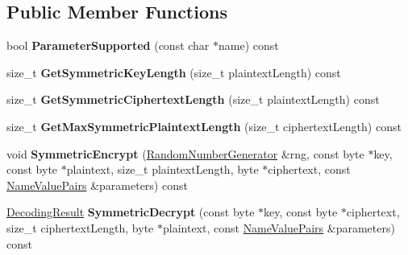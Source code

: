\subsection*{Public Member Functions}
\begin{DoxyCompactItemize}
\item 
\hypertarget{class_d_l___encryption_algorithm___xor_acc408852b435f42e49e8df2ea8d11bc2}{
bool {\bfseries ParameterSupported} (const char $\ast$name) const }
\label{class_d_l___encryption_algorithm___xor_acc408852b435f42e49e8df2ea8d11bc2}

\item 
\hypertarget{class_d_l___encryption_algorithm___xor_a0412be112fa213d64e4034171683d1a0}{
size\_\-t {\bfseries GetSymmetricKeyLength} (size\_\-t plaintextLength) const }
\label{class_d_l___encryption_algorithm___xor_a0412be112fa213d64e4034171683d1a0}

\item 
\hypertarget{class_d_l___encryption_algorithm___xor_a1aafb7e592295434ca56b4bc5813a000}{
size\_\-t {\bfseries GetSymmetricCiphertextLength} (size\_\-t plaintextLength) const }
\label{class_d_l___encryption_algorithm___xor_a1aafb7e592295434ca56b4bc5813a000}

\item 
\hypertarget{class_d_l___encryption_algorithm___xor_a410daf0e1131956e0382fc8d66d964f5}{
size\_\-t {\bfseries GetMaxSymmetricPlaintextLength} (size\_\-t ciphertextLength) const }
\label{class_d_l___encryption_algorithm___xor_a410daf0e1131956e0382fc8d66d964f5}

\item 
\hypertarget{class_d_l___encryption_algorithm___xor_a4986d6fccb45fc89db7be25f49c4bd8c}{
void {\bfseries SymmetricEncrypt} (\hyperlink{class_random_number_generator}{RandomNumberGenerator} \&rng, const byte $\ast$key, const byte $\ast$plaintext, size\_\-t plaintextLength, byte $\ast$ciphertext, const \hyperlink{class_name_value_pairs}{NameValuePairs} \&parameters) const }
\label{class_d_l___encryption_algorithm___xor_a4986d6fccb45fc89db7be25f49c4bd8c}

\item 
\hypertarget{class_d_l___encryption_algorithm___xor_a2f95a94a4be76876ddb93c6cb9c44a49}{
\hyperlink{struct_decoding_result}{DecodingResult} {\bfseries SymmetricDecrypt} (const byte $\ast$key, const byte $\ast$ciphertext, size\_\-t ciphertextLength, byte $\ast$plaintext, const \hyperlink{class_name_value_pairs}{NameValuePairs} \&parameters) const }
\label{class_d_l___encryption_algorithm___xor_a2f95a94a4be76876ddb93c6cb9c44a49}

\end{DoxyCompactItemize}


